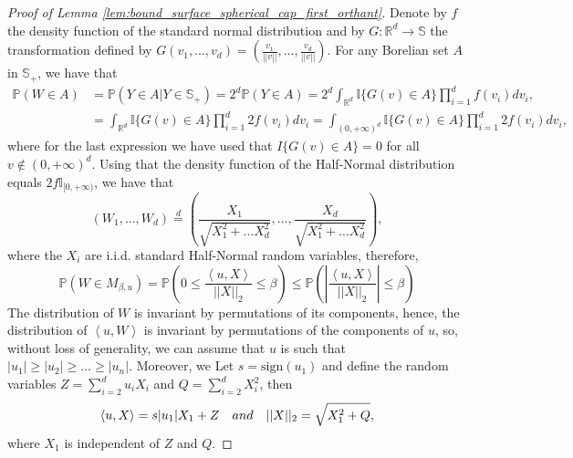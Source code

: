 \documentclass{article}
\numberwithin{equation}{section}
\newcommand{\R}{\mathbb{R}}
\newcommand{\I}{\mathbb{I}}
\renewcommand{\P}{\mathbb{P}}
\newcommand{\sphere}{\mathbb{S}}
\newcommand{\innerprod}[2]{\left\langle #1, #2 \right\rangle}
\begin{document}
\begin{proof}[Proof of Lemma
    \ref{lem:bound_surface_spherical_cap_first_orthant}]
    Denote by \(f\) the density function of the standard normal
    distribution and by \(G:\R^d\to\sphere\) the transformation defined by
    \(G(v_1,\ldots,v_d)=\left(
    \frac{v_1}{||v||},\ldots,\frac{v_d}{||v||} \right)\). For any
    Borelian set \(A\)
    in \(\sphere_+\), we have that
    \begin{align*}
        \P\left( W\in A \right) &= \P\left( Y\in A|Y\in\sphere_+
        \right) = 2^{d}\P(Y\in A) =
        2^d\int_{\R^d}\I\{ G(v)\in A \}\prod_{i=1}^{d}f(v_i)dv_i,\\
        &=\int_{\R^d}\I\{ G(v)\in A \}\prod_{i=1}^{d}2f(v_i)dv_i =
        \int_{(0,+\infty)^d}\I\{ G(v)\in A \}\prod_{i=1}^{d}2f(v_i)dv_i,
    \end{align*}
    where for the last expression we have used that \(I\{G(v)\in A\}=0\)
    for all \(v\not\in (0,+\infty)^d\). Using that the density function
    of the Half-Normal distribution
    equals \(2f\I_{[0,+\infty)}\), we have that
    \begin{equation}\label{eq:joint_distribution_uniform_orthant}
        \left(W_1,\ldots,W_d \right) \overset{d}{=}
        \left(\frac{X_1}{\sqrt{X_1^2+\dots X_d^2}},\ldots,
        \frac{X_d}{\sqrt{X_1^2+\dots X_d^2}} \right),
    \end{equation}
    where the \(X_i\) are i.i.d. standard Half-Normal random
    variables, therefore,
    \begin{equation}\label{eq:prob_bound_interval}
        \P\left( W\in M_{\beta,u} \right) = \P\left(0\leq
            \frac{\innerprod{u}{X}}{||X||_2}
        \leq \beta \right)\leq \P\left( \left|
        \frac{\innerprod{u}{X}}{||X||_2} \right|\leq \beta \right)
    \end{equation}
    The distribution of \(W\) is invariant by permutations of its
    components, hence,
    the distribution of \(\innerprod{u}{W}\) is invariant by permutations of the
    components of \(u\),
    so, without loss of generality, we can assume that \(u\) is such
    that \(|u_1|\geq|u_2|\geq\dots\geq|u_n|\). Moreover, we  Let
    \(s=\mathrm{sign}{(u_1)}\) and define the
    random variables \(Z = \sum_{i=2}^{d}u_iX_i\) and \(Q=\sum_{i=2}^{d}X_i^2\),
    then
    \begin{equation}
        \innerprod{u}{X} =
        s|u_1|X_1+Z\quad\mathnormal{and}\quad||X||_2=\sqrt{X_1^2+Q},
    \end{equation}
    where \(X_1\) is independent of \(Z\) and \(Q\).


\end{proof}
\end{document}
